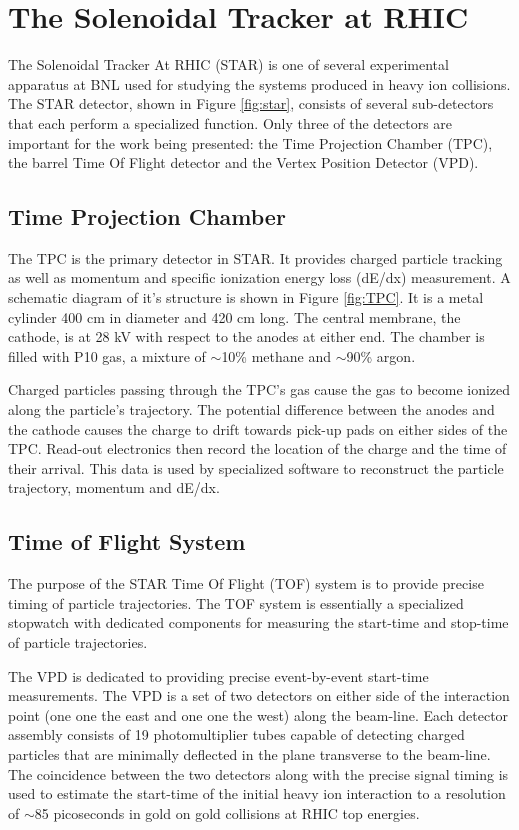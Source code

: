 \section{The Solenoidal Tracker at RHIC}
The Solenoidal Tracker At RHIC (STAR) is one of several experimental apparatus at BNL used for studying the systems produced in heavy ion collisions. The STAR detector, shown in Figure \ref{fig:star}, consists of several sub-detectors that each perform a specialized function. Only three of the detectors are important for the work being presented: the Time Projection Chamber (TPC), the barrel Time Of Flight detector and the Vertex Position Detector (VPD). 

\subsection{ Time Projection Chamber }
The TPC is the primary detector in STAR. It provides charged particle tracking as well as momentum and specific ionization energy loss (dE/dx) measurement. A schematic diagram of it's structure is shown in Figure \ref{fig:TPC}. It is a metal cylinder 400 cm in diameter and 420 cm long. The central membrane, the cathode, is at 28 kV with respect to the anodes at either end. The chamber is filled with P10 gas, a mixture of $\sim$10\% methane and $\sim$90\% argon\cite{anderson_star_2003}. 

Charged particles passing through the TPC's gas cause the gas to become ionized along the particle's trajectory. The potential difference between the anodes and the cathode causes the charge to drift towards pick-up pads on either sides of the TPC. Read-out electronics then record the location of the charge and the time of their arrival. This data is used by specialized software to reconstruct the particle trajectory, momentum and dE/dx.


\subsection{ Time of Flight System }
The purpose of the STAR Time Of Flight (TOF) system is to provide precise timing of particle trajectories. The TOF system is essentially a specialized stopwatch with dedicated components for measuring the start-time and stop-time of particle trajectories.

The VPD is dedicated to providing precise event-by-event start-time measurements. The VPD is a set of two detectors on either side of the interaction point (one one the east and one one the west) along the beam-line. Each detector assembly consists of 19 photomultiplier tubes capable of detecting charged particles that are minimally deflected in the plane transverse to the beam-line. The coincidence between the two detectors along with the precise signal timing is used to estimate the start-time of the initial heavy ion interaction to a resolution of $\sim$85 picoseconds in gold on gold collisions at RHIC top energies\cite{llope_star_2014}.

